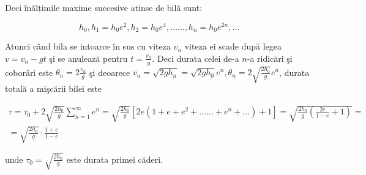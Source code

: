 Deci înălțimile maxime succesive atinse de bilă sunt:

$$
h_{0}, h_{1}=h_{0} e^{2}, h_{2}=h_{0} e^{4}, \ldots \ldots, h_{n}=h_{0} e^{2 n}, \ldots
$$

Atunci când bila se intoarce în sus cu viteza $v_{n}$ viteza ei scade după legea $v=v_{n}-g t$ şi se anulează pentru $t=\frac{v_{n}}{g}$. Deci durata celei de-a $n$-a ridicări şi coborâri este $\theta_{n}=2 \frac{v_{n}}{g}$ şi deoarece $v_{n}=\sqrt{2 g h_{n}}=\sqrt{2 g h_{0}} e^{n}, \theta_{n}=2 \sqrt{\frac{2 h_{0}}{g}} e^{n}$, durata totală a mişcării bilei este

$$
\begin{gathered}
\tau=\tau_{0}+2 \sqrt{\frac{2 h_{0}}{g}} \sum_{n=1}^{\infty} e^{n}=\sqrt{\frac{2 h_{0}}{g}}\left[2 e\left(1+e+e^{2}+\ldots \ldots+e^{n}+\ldots\right)+1\right]=\sqrt{\frac{2 h_{0}}{g}\left(\frac{2 e}{1-e}+1\right)}= \\
=\sqrt{\frac{2 h_{0}}{g}} \cdot \frac{1+e}{1-e}
\end{gathered}
$$

unde $\tau_{0}=\sqrt{\frac{2 h_{0}}{g}}$ este durata primei căderi.

